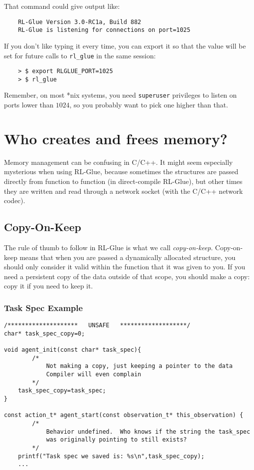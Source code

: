 \documentclass[11pt]{article}
\begin{document}
That command could give output like:
\begin{verbatim}
	RL-Glue Version 3.0-RC1a, Build 882
	RL-Glue is listening for connections on port=1025
\end{verbatim}

If you don't like typing it every time, you can export it so that the value will be set for future
calls to \texttt{rl\_glue} in the same session:
\begin{verbatim}
	> $ export RLGLUE_PORT=1025
	> $ rl_glue 
\end{verbatim}

Remember, on most *nix systems, you need \texttt{superuser} privileges to listen on ports lower than $1024$, so you probably want to pick one higher than that.


\section{Who creates and frees memory?}
Memory management can be confusing in C/C++.  It might seem especially mysterious when using RL-Glue, because sometimes the structures are passed directly 
from function to function (in direct-compile RL-Glue), but other times they are written and read through a network socket (with the C/C++ network codec).

\subsection{Copy-On-Keep}
The rule of thumb to follow in RL-Glue is what we call \textit{copy-on-keep}.  Copy-on-keep means that when you are passed a dynamically allocated structure, you should
only consider it valid within the function that it was given to you.  If you need a persistent copy of the data outside of that scope, you should make a copy: copy it if you
need to keep it.

\subsubsection{Task Spec Example}
\begin{verbatim}
/********************   UNSAFE   *******************/
char* task_spec_copy=0;
	
void agent_init(const char* task_spec){
        /*
            Not making a copy, just keeping a pointer to the data
            Compiler will even complain 
        */
    task_spec_copy=task_spec;
}

const action_t* agent_start(const observation_t* this_observation) {
        /*
            Behavior undefined.  Who knows if the string the task_spec
            was originally pointing to still exists?
        */
    printf("Task spec we saved is: %s\n",task_spec_copy);
    ...
\end{verbatim}
\end{document}

